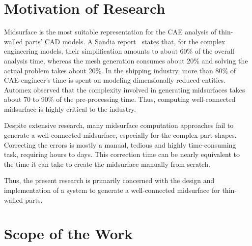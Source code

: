 \section{Motivation of Research}

 Midsurface is the most suitable representation for the CAE analysis of thin-walled parts' CAD models. 
 A Sandia report~\cite{Ming2012} states that, for the complex engineering models, their simplification amounts to about 60\% of the overall analysis time, whereas the mesh generation consumes about 20\% and solving the actual problem takes about 20\%.  In the shipping industry, more than 80\% of CAE engineer's time is spent on modeling dimensionally reduced entities\cite{Austreng2007}. Automex\cite{Automex} observed that the complexity involved in generating midsurfaces takes about 70 to 90\% of the pre-processing time. %
Thus,  computing well-connected midsurface is highly critical to the industry.

Despite extensive research, many midsurface computation approaches fail to generate a well-connected midsurface, especially for the complex part shapes. Correcting the errors is mostly a manual, tedious and highly time-consuming task, requiring hours to days. This correction time can be nearly equivalent to the time it can take to create the midsurface manually from scratch\cite{Stolt2006}. 

Thus, the present research is primarily concerned with the design and implementation of a system to generate a well-connected midsurface for thin-walled parts.

\section{Scope of the Work}  \label{sec:litsurvey:rscope}



